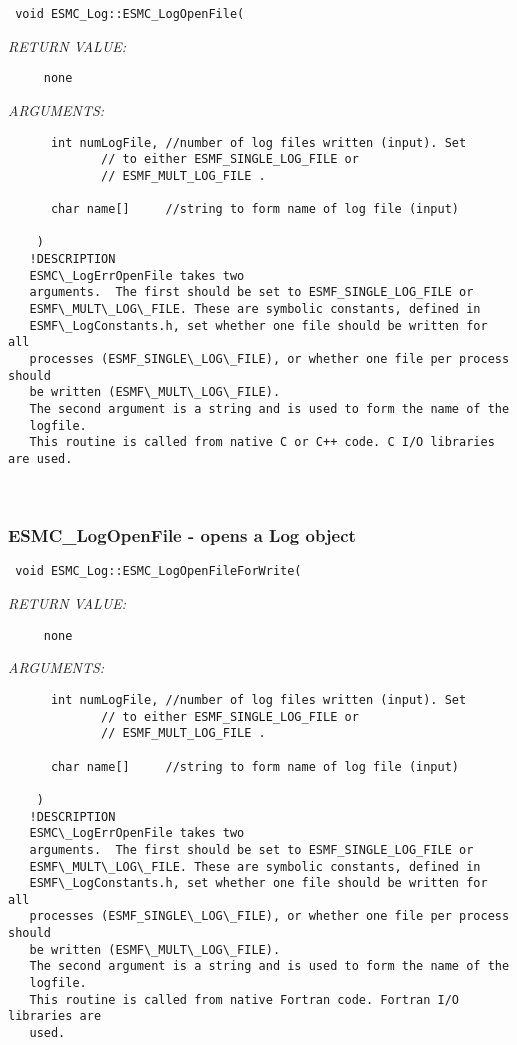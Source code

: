   
\begin{verbatim} 
 void ESMC_Log::ESMC_LogOpenFile(\end{verbatim}{\em RETURN VALUE:}
\begin{verbatim}     none\end{verbatim}{\em ARGUMENTS:}
\begin{verbatim} 
      int numLogFile, //number of log files written (input). Set
 		     // to either ESMF_SINGLE_LOG_FILE or
 		     // ESMF_MULT_LOG_FILE .
 
      char name[]     //string to form name of log file (input)
 
    )
   !DESCRIPTION
   ESMC\_LogErrOpenFile takes two
   arguments.  The first should be set to ESMF_SINGLE_LOG_FILE or
   ESMF\_MULT\_LOG\_FILE. These are symbolic constants, defined in
   ESMF\_LogConstants.h, set whether one file should be written for all 
   processes (ESMF_SINGLE\_LOG\_FILE), or whether one file per process should
   be written (ESMF\_MULT\_LOG\_FILE).
   The second argument is a string and is used to form the name of the
   logfile.
   This routine is called from native C or C++ code. C I/O libraries are used.\end{verbatim}
 
 
\mbox{}\hrulefill\ 
 
\subsubsection [ESMC\_LogOpenFile] {ESMC\_LogOpenFile - opens a Log object}


  
\begin{verbatim} 
 void ESMC_Log::ESMC_LogOpenFileForWrite(\end{verbatim}{\em RETURN VALUE:}
\begin{verbatim}     none\end{verbatim}{\em ARGUMENTS:}
\begin{verbatim} 
      int numLogFile, //number of log files written (input). Set
 		     // to either ESMF_SINGLE_LOG_FILE or
 		     // ESMF_MULT_LOG_FILE .
 
      char name[]     //string to form name of log file (input)
 
    )
   !DESCRIPTION
   ESMC\_LogErrOpenFile takes two
   arguments.  The first should be set to ESMF_SINGLE_LOG_FILE or
   ESMF\_MULT\_LOG\_FILE. These are symbolic constants, defined in
   ESMF\_LogConstants.h, set whether one file should be written for all 
   processes (ESMF_SINGLE\_LOG\_FILE), or whether one file per process should
   be written (ESMF\_MULT\_LOG\_FILE).
   The second argument is a string and is used to form the name of the
   logfile.
   This routine is called from native Fortran code. Fortran I/O libraries are
   used.\end{verbatim}
 
